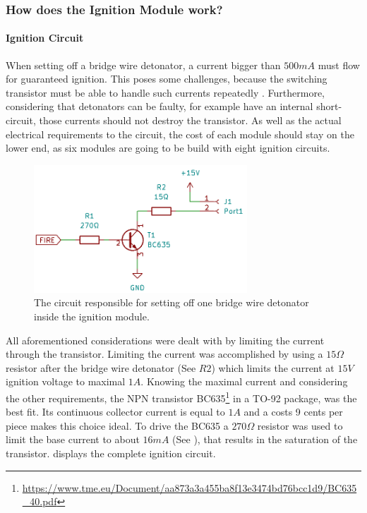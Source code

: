 \pagebreak

\subsubsection{How does the Ignition Module work?}

\paragraph{Ignition Circuit}
\noindent When setting off a bridge wire detonator, a current bigger than $500mA$ must flow for guaranteed ignition. This poses some challenges, because the switching transistor must be able to handle such currents repeatedly . Furthermore, considering that detonators can be faulty, for example have an internal short-circuit, those currents should not destroy the transistor. As well as the actual electrical requirements to the circuit, the cost of each module should stay on the lower end, as six modules are going to be build with eight ignition circuits.\\

\begin{figure}[!ht]
    \centering
    \includegraphics[width=8cm]{./Figures/module_ignitor.png}
    \caption{The circuit responsible for setting off one bridge wire detonator inside the ignition module.}
    \label{fig:module_ignitor}     
\end{figure}

\noindent All aforementioned considerations were dealt with by limiting the current through the transistor. Limiting the current was  accomplished by using a $15\Omega$ resistor after the bridge wire detonator (See  $R2$) which limits the current at $15V$ ignition voltage to maximal $1A$. Knowing the maximal current and considering the other requirements, the NPN transistor BC635\footnote{\url{https://www.tme.eu/Document/aa873a3a455ba8f13e3474bd76bcc1d9/BC635_40.pdf}} in a TO-92 package, was the best fit. Its continuous collector current is equal to $1A$ and a costs 9 cents per piece makes this choice ideal. To drive the BC635 a $270\Omega$ resistor was used to limit the base current to about $16mA$ (See ), that results in the saturation of the transistor.  displays the complete ignition circuit.

